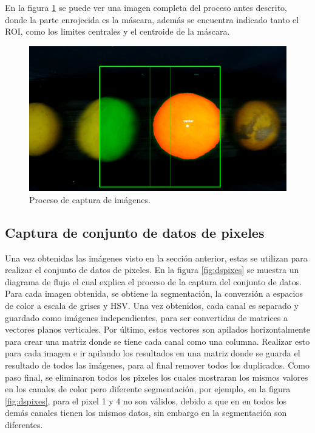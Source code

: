 \documentclass[twoside,spanish,ESP,MSc]{plantillaLabUPV}
\theoremstyle{definition}
\begin{document}
En la figura \ref{fig:framito} se puede ver una imagen completa del proceso antes descrito, donde la parte enrojecida es la máscara, además se encuentra indicado tanto el ROI, como los limites centrales y el centroide de la máscara.

\begin{figure}
	\centering
	\includegraphics[width=0.7\linewidth]{framito}
	\caption{Proceso de captura de imágenes.}
	\label{fig:framito}
\end{figure}


\subsection{Captura de conjunto de datos de pixeles}
Una vez obtenidas las imágenes visto en la sección anterior, estas se utilizan para realizar el conjunto de datos de pixeles. En la figura \ref{fig:dspixes} se muestra un diagrama de flujo el cual explica el proceso de la captura del conjunto de datos. Para cada imagen obtenida, se obtiene la segmentación, la conversión a espacios de color a escala de grises y HSV. Una vez obtenidos, cada canal es separado y guardado como imágenes independientes, para ser convertidas de matrices a vectores planos verticales. Por último, estos vectores son apilados horizontalmente para crear una matriz donde se tiene cada canal como una columna. Realizar esto para cada imagen e ir apilando los resultados en una matriz donde se guarda el resultado de todos las imágenes, para al final remover todos los duplicados. Como paso final, se eliminaron todos los pixeles los cuales mostraran los mismos valores en los canales de color pero diferente segmentación, por ejemplo, en la figura \ref{fig:dspixes}, para el pixel 1 y 4 no son válidos, debido a que en en todos los demás canales tienen los mismos datos, sin embargo en la segmentación son diferentes.

\end{document}
